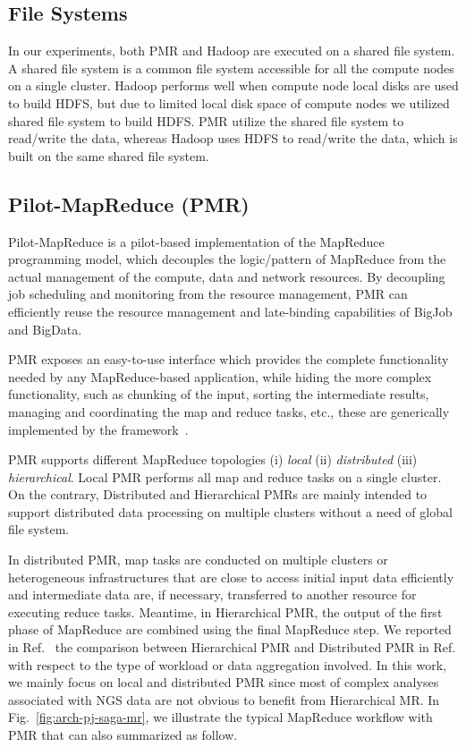 \documentclass{acm_proc_article-sp}
\begin{document}
\subsection{File Systems}

In our experiments, both PMR and Hadoop are executed on a shared file system.
A shared file system is a common file system accessible for all the compute nodes on a single cluster.
Hadoop performs well when compute node local disks are used to build HDFS, but due to limited local disk space of compute nodes we utilized shared file system to build HDFS. 
PMR utilize the shared file system to read/write the data, whereas Hadoop uses HDFS to read/write the data, which is built on the same shared file system.

\subsection{Pilot-MapReduce (PMR)}

Pilot-MapReduce is a pilot-based implementation of the MapReduce
programming model, which decouples the logic/pattern of MapReduce from
the actual management of the compute, data and network resources. By
decoupling job scheduling and monitoring from the resource management,
PMR can efficiently reuse the resource management and late-binding
capabilities of BigJob and BigData.

PMR exposes an easy-to-use interface which provides the complete
functionality needed by any MapReduce-based application, while hiding
the more complex functionality, such as chunking of the input, sorting
the intermediate results, managing and coordinating the map and reduce
tasks, etc., these are generically implemented by the
framework~\cite{pmr2012}.  

PMR supports different MapReduce topologies (i) \emph{local} (ii)
\emph{distributed} (iii) \emph{hierarchical}. Local PMR performs all
map and reduce tasks on a single cluster.  On the contrary, Distributed and
Hierarchical PMRs are mainly intended to support distributed data
processing  on multiple clusters without a need of global file system.

In distributed PMR, map tasks are conducted on multiple clusters or heterogeneous infrastructures that are close to access initial input data efficiently and intermediate data are, if necessary, transferred to another resource for executing reduce tasks.  Meantime, in Hierarchical PMR, the
output of the first phase of MapReduce are combined using the final MapReduce
step.  We reported in Ref.~\cite{pmr2012} the comparison between Hierarchical PMR and
Distributed PMR in Ref. with respect to the type of workload or data aggregation involved. In this work, we mainly focus on local and distributed PMR since most of complex analyses associated with NGS data are not obvious to benefit from Hierarchical MR.   In Fig.~\ref{fig:arch-pj-saga-mr}, we  illustrate the typical MapReduce workflow with PMR that can also summarized as follow.
\end{document}
